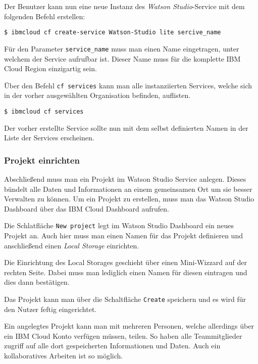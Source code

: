 Der Benutzer kann nun eine neue Instanz des \textit{Watson Studio}-Service mit dem folgenden Befehl erstellen:

\begin{lstlisting}[caption=Instanziierung des Watson Studio Services, label=ls:vorbereitung_watsonservice]
    $ ibmcloud cf create-service Watson-Studio lite sercive_name
\end{lstlisting}

Für den Parameter \texttt{service\_name} muss man einen Name eingetragen, unter welchem der Service aufrufbar ist. Dieser
Name muss für die komplette IBM Cloud Region einzigartig sein.

Über den Befehl \texttt{cf services} kann man alle instanziierten Services, welche sich in der vorher ausgewählten
Organisation befinden, auflisten.

\begin{lstlisting}[caption=Auflisten aller Services in einer Organisation, label=ls:vorbereitung_alleservices]
    $ ibmcloud cf services
\end{lstlisting}

Der vorher erstellte Service sollte nun mit dem selbst definierten Namen in der Liste der Services erscheinen.

\subsubsection{Projekt einrichten}
Abschließend muss man ein Projekt im Watson Studio Service anlegen. Dieses bündelt alle Daten und Informationen an einem
gemeinsamen Ort um sie besser Verwalten zu können. Um ein Projekt zu erstellen, muss man das Watson Studio Dashboard
über das IBM Cloud Dashboard aufrufen.

Die Schlatfläche \texttt{New project} legt im Watson Studio Dashboard ein neues Projekt an. Auch hier muss man einen
Namen für das Projekt definieren und anschließend einen \textit{Local Storage} einrichten.

Die Einrichtung des Local Storages geschieht über einen Mini-Wizzard auf der rechten Seite. Dabei muss man lediglich
einen Namen für diesen eintragen und dies dann bestätigen.

Das Projekt kann man über die Schaltfläche \texttt{Create} speichern und es wird für den Nutzer feftig eingerichtet.

Ein angelegtes Projekt kann man mit mehreren Personen, welche allerdings über ein IBM Cloud Konto verfügen müssen,
teilen. So haben alle Teammitglieder zugriff auf alle dort gespeicherten Informationen und Daten. Auch ein
kollaboratives Arbeiten ist so möglich.

